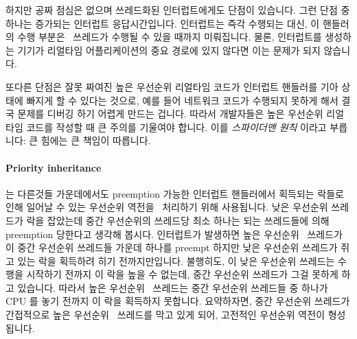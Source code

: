 \fi

하지만 공짜 점심은 없으며 쓰레드화된 인터럽트에게도 단점이 있습니다.
그런 단점 중 하나는 증가되는 인터럽트 응답시간입니다.
인터럽트는 즉각 수행되는 대신, 이 핸들러의 수행 부분은 \IRQ\ 쓰레드가 수행될 수
있을 때까지 미뤄집니다.
물론, 인터럽트를 생성하는 기기가 리얼타임 어플리케이션의 중요 경로에 있지
않다면 이는 문제가 되지 않습니다.

또다른 단점은 잘못 짜여진 높은 우선순위 리얼타임 코드가 인터럽트 핸들러를 기아
상태에 빠지게 할 수 있다는 것으로, 예를 들어 네트워크 코드가 수행되지 못하게
해서 결국 문제를 디버깅 하기 어렵게 만드는 겁니다.
따라서 개발자들은 높은 우선순위 리얼타임 코드를 작성할 때 큰 주의를 기울여야
합니다.
이를 \emph{스파이더맨 원칙} 이라고 부릅니다: 큰 힘에는 큰 책임이 따릅니다.

\paragraph{Priority inheritance} 는 다른것들 가운데에서도 preemption 가능한
인터럽트 핸들러에서 획득되는 락들로 인해 일어날 수
있는 우선순위 역전을~\cite{LuiSha1990PriorityInheritance} 처리하기 위해
사용됩니다.
낮은 우선순위 쓰레드가 락을 잡았는데 중간 우선순위의 쓰레드당 최소 하나는 되는
쓰레드들에 의해 preemption 당한다고 생각해 봅시다.
인터럽트가 발생하면 높은 우선순위 \IRQ\ 쓰레드가 이 중간 우선순위 쓰레드들
가운데 하나를 preempt 하지만 낮은 우선순위 쓰레드가 쥐고 있는 락을 획득하려
히기 전까지만입니다.
불행히도, 이 낮은 우선순위 쓰레드는 수행을 시작하기 전까지 이 락을 높을 수
없는데, 중간 우선순위 쓰레드가 그걸 못하게 하고 있습니다.
따라서 높은 우선순위 \IRQ\ 쓰레드는 중간 우선순위 쓰레드들 중 하나가 CPU 를
놓기 전까지 이 락을 획득하지 못합니다.
요약하자면, 중간 우선순위 쓰레드가 간접적으로 높은 우선순위 \IRQ\ 쓰레드를 막고
있게 되어, 고전적인 우선순위 역전이 형성됩니다.

